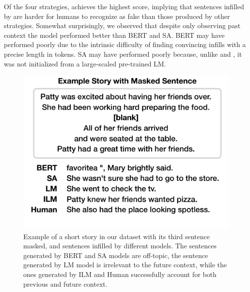 Of the four strategies, \ilm{} achieves the highest score, implying that sentences infilled by \ilm{} are harder for humans to recognize as fake than those produced by other strategies. 
Somewhat surprisingly, we observed that despite only observing past context the \lm{} model performed better than BERT and SA. 
BERT may have performed poorly due to the intrinsic difficulty of finding convincing infills with a precise length in tokens. 
SA may have performed poorly because, unlike \lm{} and \ilm{}, it was not initialized from a large-scaled pre-trained LM. 

\begin{figure}[t]
    \centering
    \includegraphics[width=1\linewidth]{figures/ilm_figure3_final.pdf}
    \vspace{-1cm}
    \caption{Example of a short story in our \stories{} dataset with its third sentence masked, and sentences infilled by different models. The sentences generated by BERT and SA models are off-topic, the sentence generated by LM model is irrelevant to the future context, while the ones generated by ILM and Human successfully account for both previous and future context.}
    \label{fig:human_eval_example}
\end{figure}